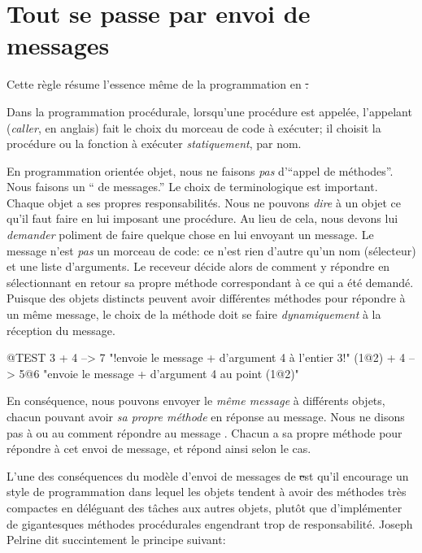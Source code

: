 \documentclass[a4paper,10pt,twoside]{book}
\begin{document}
\section{Tout se passe par envoi de messages}


Cette r\`egle r\'esume l'essence m\^eme de la programmation en \st.

Dans la programmation proc\'edurale, lorsqu'une proc\'edure est appel\'ee, l'appelant (\emph{caller}, en anglais) fait le choix du morceau de code \`a ex\'ecuter; il choisit la proc\'edure ou la fonction \`a ex\'ecuter \emph{statiquement}, par nom.  

En programmation orient\'ee objet, nous ne faisons \emph{pas} d'``appel de m\'ethodes''. Nous faisons un `` de messages.''
Le choix de terminologique est important.
Chaque objet a ses propres responsabilit\'es.
Nous ne pouvons \emph{dire} \`a un objet ce qu'il faut faire en lui imposant 
une proc\'edure.
Au lieu de cela, nous devons lui \emph{demander} poliment de faire quelque chose en lui envoyant un message.
Le message n'est \emph{pas} un morceau de code: ce n'est rien d'autre qu'un nom (s\'electeur) et une liste d'arguments.
Le receveur d\'ecide alors de comment y r\'epondre en s\'electionnant en retour
sa propre m\'ethode correspondant \`a ce qui a \'et\'e demand\'e.
Puisque des objets distincts peuvent avoir diff\'erentes m\'ethodes pour r\'epondre \`a un m\^eme message, le choix de la m\'ethode doit se faire \emph{dynamiquement} \`a la r\'eception du message.
\begin{code}{@TEST}
3 + 4         --> 7          "!envoie le message + d'argument 4 \`a l'entier  3!"
(1@2) + 4 --> 5@6    "envoie le message + d'argument 4 au point (1@2)"
\end{code}
\noindent
En cons\'equence, nous pouvons envoyer le \emph{m\^eme message} \`a diff\'erents objets, chacun pouvant avoir \emph{sa propre m\'ethode} en r\'eponse au message.
Nous ne disons pas \`a   ou au   comment r\'epondre au message .
Chacun a sa propre m\'ethode pour r\'epondre \`a cet envoi de message, et r\'epond ainsi selon le cas.

L'une des cons\'equences du mod\`ele d'envoi de messages de \st est qu'il encourage un style de programmation dans lequel les objets tendent \`a avoir des m\'ethodes tr\`es compactes en d\'el\'eguant des t\^aches aux autres objets, plut\^ot que d'impl\'ementer de gigantesques m\'ethodes proc\'edurales engendrant trop de responsabilit\'e.
Joseph Pelrine
dit succintement le principe suivant:
\end{document}
